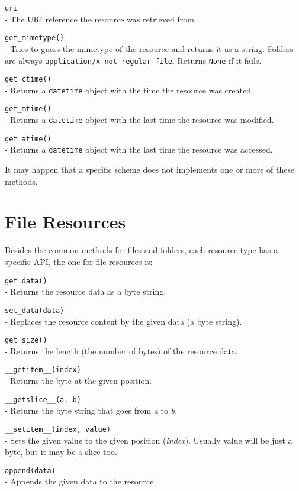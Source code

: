 \begin{api}
  {\tt uri}\\
  - The URI reference the resource was retrieved from.

  {\tt get\_mimetype()}\\
  - Tries to guess the mimetype of the resource and returns it as a string.
    Folders are always {\tt application/x-not-regular-file}. Returns {\tt None}
    if it fails.

  {\tt get\_ctime()}\\
  - Returns a {\tt datetime} object with the time the resource was created.

  {\tt get\_mtime()}\\
  - Returns a {\tt datetime} object with the last time the resource was
    modified.

  {\tt get\_atime()}\\
  - Returns a {\tt datetime} object with the last time the resource was
    accessed.
\end{api}

It may happen that a specific scheme does not implements one or more of
these methods.

\section{File Resources}

Besides the common methods for files and folders, each resource type has
a specific API, the one for file resources is:

\begin{api}
  {\tt get\_data()}\\
  - Returns the resource data as a byte string.

  {\tt set\_data(data)}\\
  - Replaces the resource content by the given data (a byte string).

  {\tt get\_size()}\\
  - Returns the length (the number of bytes) of the resource data.

  {\tt \_\_getitem\_\_(index)}\\
  - Returns the byte at the given position.

  {\tt \_\_getslice\_\_(a, b)}\\
  - Returns the byte string that goes from {\em a} to {\em b}.

  {\tt \_\_setitem\_\_(index, value)}\\
  - Sets the given value to the given position ({\em index}). Usually
    value will be just a byte, but it may be a slice too.

  {\tt append(data)}\\
  - Appends the given data to the resource.
\end{api}

